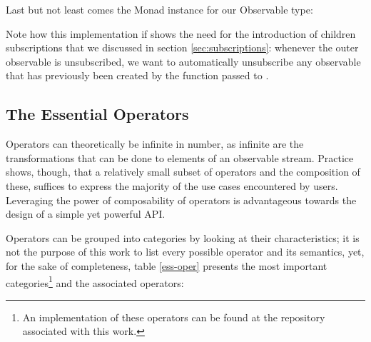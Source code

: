 Last but not least comes the Monad instance for our Observable type:


Note how this implementation if \code{(>>=)} shows the need for the introduction of children subscriptions that we discussed in section \ref{sec:subscriptions}: whenever the outer observable is unsubscribed, we want to automatically unsubscribe any observable that has previously been created by the function passed to \code{(>>=)}.

\subsection{The Essential Operators}
Operators can theoretically be infinite in number, as infinite are the transformations that can be done to elements of an observable stream. Practice shows, though, that a relatively small subset of operators and the composition of these, suffices to express the majority of the use cases encountered by users. Leveraging the power of composability of operators is advantageous towards the design of a simple yet powerful API.

Operators can be grouped into categories by looking at their characteristics; it is not the purpose of this work to list every possible operator and its semantics, yet, for the sake of completeness, table \ref{ess-oper} presents the most important categories\footnote{An implementation of these operators can be found at the repository associated with this work.} and the associated operators:

